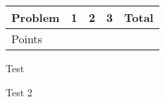 \documentclass{fkpset}
\begin{document}
  \vspace{-2.3cm}
  \begin{table}[h]
    \centering
    \begin{tabular}{@{}lcccr@{}} %
        \toprule
        Problem & 1 & 2 & 3 & Total \\ \midrule
        Points  &   &   &   & \\ \bottomrule
    \end{tabular}
  \end{table}
  \vspace{1.5cm}

  \begin{problem}[1 (Sagan 1.13)]
    Test
  \end{problem}
  \begin{solution}

  \end{solution}
  \clearpage

  \begin{problem}[2]
    Test 2
  \end{problem}
\end{document}
